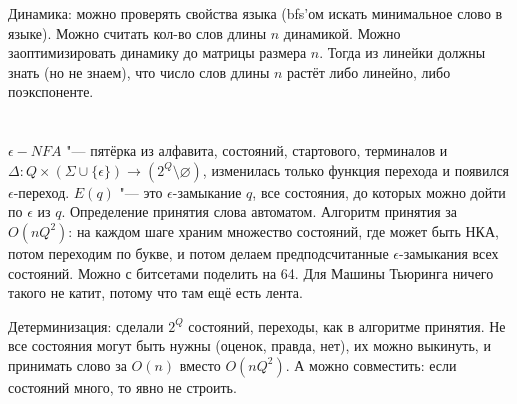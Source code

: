	Динамика: можно проверять свойства языка (bfs'ом искать минимальное слово в языке).
	Можно считать кол-во слов длины $n$ динамикой.
	Можно заоптимизировать динамику до матрицы размера $n$.
	Тогда из линейки должны знать (но не знаем), что число слов длины $n$ растёт либо линейно, либо поэкспоненте.

\section{} %
	$\epsilon-NFA$ "--- пятёрка из алфавита, состояний, стартового, терминалов и $\Delta \colon Q \times (\Sigma \cup \{\epsilon\}) \to (2^Q\setminus \varnothing)$,
	изменилась только функция перехода и появился $\epsilon$-переход.
	$E(q)$ "--- это $\epsilon$-замыкание $q$, все состояния, до которых можно дойти по $\epsilon$ из $q$.
	Определение принятия слова автоматом.
	Алгоритм принятия за $O(nQ^2)$: на каждом шаге храним множество состояний, где может быть НКА,
	потом переходим по букве, и потом делаем предподсчитанные $\epsilon$-замыкания всех состояний.
	Можно с битсетами поделить на 64.
	Для Машины Тьюринга ничего такого не катит, потому что там ещё есть лента.

	Детерминизация: сделали $2^Q$ состояний, переходы, как в алгоритме принятия.
	Не все состояния могут быть нужны (оценок, правда, нет), их можно выкинуть, и принимать слово за $O(n)$ вместо $O(nQ^2)$.
	А можно совместить: если состояний много, то явно не строить.
